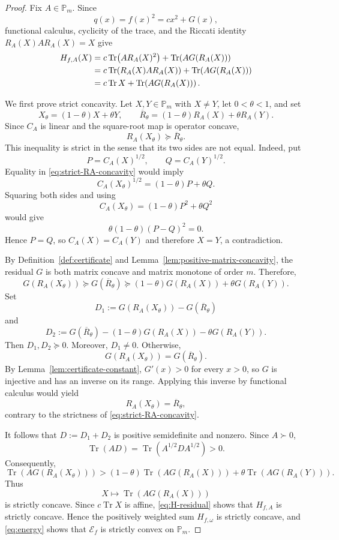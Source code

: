 \documentclass[10pt,a4paper]{amsart}
\newcommand{\Pm}{\mathbb P_m}
\newcommand{\Tr}{\operatorname{Tr}}
\begin{document}
 \begin{proof}
		Fix $A\in\Pm$.  Since
		\[
		q(x)=f(x)^2=cx^2+G(x),
		\]
		functional calculus, cyclicity of the trace, and the Riccati identity
		$R_A(X)AR_A(X)=X$ give
		\begin{align}
			H_{f,A}(X)
			&=c\Tr\!\left(AR_A(X)^2\right)
			+\Tr\!\left(AG(R_A(X))\right) \notag\\
			&=c\Tr\!\left(R_A(X)AR_A(X)\right)
			+\Tr\!\left(AG(R_A(X))\right) \notag\\
			&=c\Tr X+\Tr\!\left(AG(R_A(X))\right).
			\label{eq:H-residual}
		\end{align}
		
		We first prove strict concavity.  Let $X,Y\in\Pm$ with $X\ne Y$,
		let $0<\theta<1$, and set
		\[
		X_\theta=(1-\theta)X+\theta Y,
		\qquad
		\overline R_\theta
		=(1-\theta)R_A(X)+\theta R_A(Y).
		\]
		Since $C_A$ is linear and the square-root map is operator concave,
		\begin{equation}\label{eq:strict-RA-concavity}
			R_A(X_\theta)\succeq\overline R_\theta.
		\end{equation}
		This inequality is strict in the sense that its two sides are not
		equal.  Indeed, put
		\[
		P=C_A(X)^{1/2},
		\qquad
		Q=C_A(Y)^{1/2}.
		\]
		Equality in \eqref{eq:strict-RA-concavity} would imply
		\[
		C_A(X_\theta)^{1/2}
		=(1-\theta)P+\theta Q.
		\]
		Squaring both sides and using
		\[
		C_A(X_\theta)
		=(1-\theta)P^2+\theta Q^2
		\]
		would give
		\[
		\theta(1-\theta)(P-Q)^2=0.
		\]
		Hence $P=Q$, so $C_A(X)=C_A(Y)$ and therefore $X=Y$, a
		contradiction.
		
		By Definition~\ref{def:certificate} and
		Lemma~\ref{lem:positive-matrix-concavity}, the residual $G$ is both
		matrix concave and matrix monotone of order $m$.  Therefore,
		\[
		G(R_A(X_\theta))
		\succeq G(\overline R_\theta)
		\succeq
		(1-\theta)G(R_A(X))+\theta G(R_A(Y)).
		\]
		Set
		\[
		D_1
		:=G(R_A(X_\theta))-G(\overline R_\theta)
		\]
		and
		\[
		D_2
		:=G(\overline R_\theta)
		-(1-\theta)G(R_A(X))-\theta G(R_A(Y)).
		\]
		Then $D_1,D_2\succeq0$.  Moreover, $D_1\ne0$.  Otherwise,
		\[
		G(R_A(X_\theta))=G(\overline R_\theta).
		\]
		By Lemma~\ref{lem:certificate-constant}, $G'(x)>0$ for every $x>0$,
		so $G$ is injective and has an inverse on its range.  Applying this
		inverse by functional calculus would yield
		\[
		R_A(X_\theta)=\overline R_\theta,
		\]
		contrary to the strictness of \eqref{eq:strict-RA-concavity}.
		
		It follows that $D:=D_1+D_2$ is positive semidefinite and nonzero.
		Since $A\succ0$,
		\[
		\Tr(AD)
		=\Tr\!\left(A^{1/2}DA^{1/2}\right)>0.
		\]
		Consequently,
		\[
		\Tr\!\left(AG(R_A(X_\theta))\right)
		>
		(1-\theta)\Tr\!\left(AG(R_A(X))\right)
		+\theta\Tr\!\left(AG(R_A(Y))\right).
		\]
		Thus
		\[
		X\longmapsto\Tr\!\left(AG(R_A(X))\right)
		\]
		is strictly concave.  Since $c\Tr X$ is affine,
		\eqref{eq:H-residual} shows that $H_{f,A}$ is strictly concave.
		Hence the positively weighted sum $H_{f,\omega}$ is strictly concave,
		and \eqref{eq:energy} shows that $\mathcal E_f$ is strictly convex
		on $\Pm$.
		

\end{proof}
\end{document}
